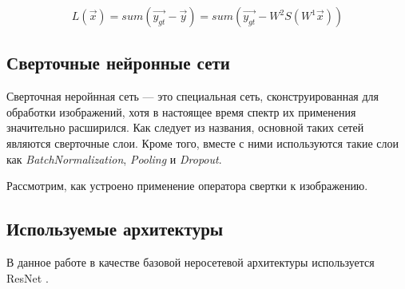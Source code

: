 \begin{equation}\label{eq:loss}
	   L(\vec{x}) = sum(\vec{y_{gt}} - \vec{y}) = sum(\vec{y_{gt}} - W^{2} S(W^{1} \vec{x}))
\end{equation}


 
 
\subsection{Сверточные нейронные сети}
\indent
\indent
Сверточная неройнная сеть --- это специальная сеть, сконструированная для 
обработки изображений, хотя в настоящее время спектр их применения 
значительно расширился. Как следует из названия, основной таких сетей 
являются сверточные слои. Кроме того, вместе с ними используются такие
слои как \textit{BatchNormalization}, \textit{Pooling} и \textit{Dropout}.

\indent
\inendt
Рассмотрим, как устроено применение оператора свертки к изображению.

\subsection{Используемые архитектуры}
В данное работе в качестве базовой неросетевой архитектуры используется
ResNet \cite{resnet}.
